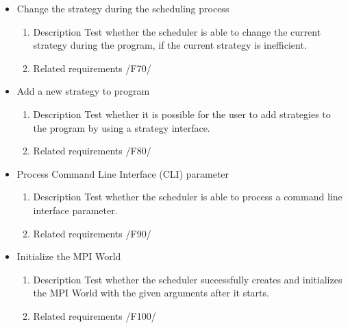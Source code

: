 {\begin{itemize}
\begin{enumerate}
\begin{itemize}
							\end{itemize}
							
						\item Related requirements\newline
 							  /F30/, /F40/, /F50/, /F60/		
				\end{enumerate}	
				
				
				
				\item Change the strategy during the scheduling process
				\begin{enumerate}
						\item Description\newline
Test whether the scheduler is able to change the current strategy during the program, if the current strategy is inefficient.
						\item Related requirements\newline
 							  /F70/		
				\end{enumerate}				
				
				\item Add a new strategy to program
				\begin{enumerate}
					\item Description\newline
Test whether it is possible for the user to add strategies to the program by using a strategy interface.
					\item Related requirements\newline
						/F80/
				\end{enumerate}
					
				
				\item Process Command Line Interface (CLI) parameter 		
					\begin{enumerate}
						\item Description\newline
Test whether the scheduler is able to process a command line interface parameter.
						\item Related requirements\newline
 							  /F90/		
				\end{enumerate}	
				
				\item Initialize the MPI World 
				\begin{enumerate}
						\item Description\newline
Test whether the scheduler successfully creates and initializes the MPI World with the given arguments after it starts.
						\item Related requirements\newline
 							  /F100/		
				\end{enumerate}




\end{itemize}}
